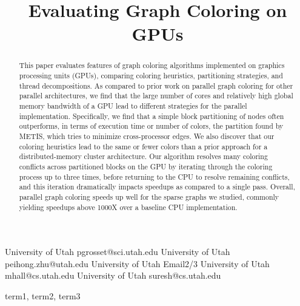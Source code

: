 \documentclass[preprint]{sigplanconf}
\begin{document}
\copyrightdata{[to be supplied]}


\title{Evaluating Graph Coloring on GPUs}

          {University of Utah}
          {pgrosset@sci.utah.edu}
          {University of Utah}
          {peihong.zhu@utah.edu}
          {University of Utah}
          {Email2/3}
          {University of Utah}
          {mhall@cs.utah.edu}
          {University of Utah}
          {suresh@cs.utah.edu}

\maketitle

\begin{abstract}
This paper evaluates features of graph coloring algorithms implemented on graphics processing units (GPUs), comparing coloring heuristics, partitioning strategies, and thread decompositions.  As compared to prior work on parallel graph coloring for other parallel architectures, we find that the large number of cores and relatively high global memory bandwidth of a GPU lead to different strategies for the parallel implementation.  Specifically, we find that a simple block partitioning of nodes often outperforms, in terms of execution time or number of colors, the partition found by METIS, which tries to minimize cross-processor edges.  We also discover that our coloring heuristics lead to the same or fewer colors than a prior approach for a distributed-memory cluster architecture.  Our algorithm resolves many coloring conflicts across partitioned blocks on the GPU by iterating through the coloring process up to three times, before returning to the CPU to resolve remaining conflicts, and this iteration dramatically impacts speedups as compared to a single pass.  Overall, parallel graph coloring speeds up well for the sparse graphs we studied, commonly yielding speedups above 1000X over a baseline CPU implementation.
\end{abstract}


\terms
term1, term2, term3
\end{document}
